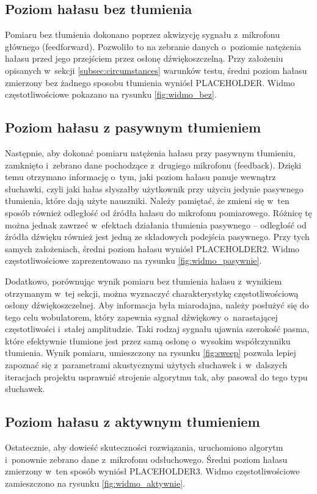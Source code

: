 \subsection{Poziom hałasu bez tłumienia}
Pomiaru bez tłumienia dokonano poprzez akwizycję sygnału z~mikrofonu głównego (feedforward). Pozwoliło to na zebranie danych o~poziomie natężenia hałasu przed jego przejściem przez osłonę dźwiękoszczelną. Przy założeniu opisanych w~sekcji \ref{subsec:circumstances} warunków testu, średni poziom hałasu zmierzony bez żadnego sposobu tłumienia wyniósł PLACEHOLDER. %
Widmo częstotliwościowe pokazano na rysunku \ref{fig:widmo_bez}.


\subsection{Poziom hałasu z pasywnym tłumieniem}
Następnie, aby dokonać pomiaru natężenia hałasu przy pasywnym tłumieniu, zamknięto i~zebrano dane pochodzące z~drugiego mikrofonu (feedback). Dzięki temu otrzymano informację o~tym, jaki poziom hałasu panuje wewnątrz słuchawki, czyli jaki hałas słyszałby użytkownik przy użyciu jedynie pasywnego tłumienia, które dają użyte nauszniki. Należy pamiętać, że zmieni się w~ten sposób również odległość od źródła hałasu do mikrofonu pomiarowego. Różnicę tę można jednak zawrzeć w~efektach działania tłumienia pasywnego -- odległość od źródła dźwięku również jest jedną ze składowych podejścia pasywnego. Przy tych samych założeniach, średni poziom hałasu wyniósł PLACEHOLDER2. %
Widmo częstotliwościowe zaprezentowano na rysunku \ref{fig:widmo_pasywnie}. 


Dodatkowo, porównując wynik pomiaru bez tłumienia hałasu z~wynikiem otrzymanym w~tej sekcji, można wyznaczyć charakterystykę częstotliwościową osłony dźwiękoszczelnej. Aby informacja była miarodajna, należy posłużyć się do tego celu wobulatorem, który zapewnia sygnał dźwiękowy o~narastającej częstotliwości i~stałej amplitudzie. Taki rodzaj sygnału ujawnia szerokość pasma, które efektywnie tłumione jest przez samą osłonę o~wysokim współczynniku tłumienia. Wynik pomiaru, umieszczony na rysunku \ref{fig:sweep} pozwala lepiej zapoznać się z~parametrami akustycznymi użytych słuchawek i~w~dalszych iteracjach projektu usprawnić strojenie algorytmu tak, aby pasował do tego typu słuchawek.

\subsection{Poziom hałasu z aktywnym tłumieniem}
Ostatecznie, aby dowieść skuteczności rozwiązania, uruchomiono algorytm i~ponownie zebrano dane z~mikrofonu odsłuchowego. Średni poziom hałasu zmierzony w~ten sposób wyniósł PLACEHOLDER3. %
Widmo częstotliwościowe zamieszczono na rysunku \ref{fig:widmo_aktywnie}.


